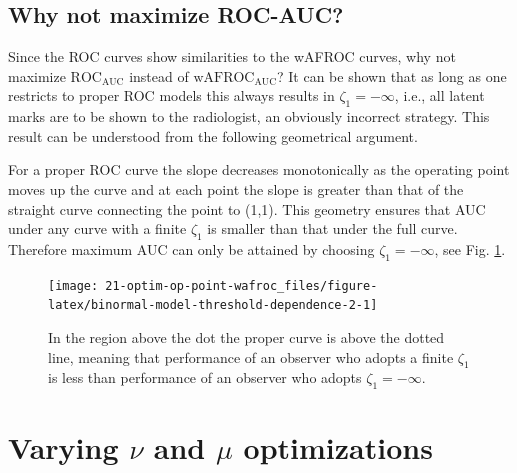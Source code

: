 \documentclass[
]{book}
\begin{document}
\hypertarget{why-not-maximize-roc-auc}{%
\subsection{Why not maximize ROC-AUC?}\label{why-not-maximize-roc-auc}}

Since the ROC curves show similarities to the wAFROC curves, why not maximize \(\text{ROC}_\text{AUC}\) instead of \(\text{wAFROC}_\text{AUC}\)? It can be shown that as long as one restricts to proper ROC models this always results in \(\zeta_1 = -\infty\), i.e., all latent marks are to be shown to the radiologist, an obviously incorrect strategy. This result can be understood from the following geometrical argument.

For a proper ROC curve the slope decreases monotonically as the operating point moves up the curve and at each point the slope is greater than that of the straight curve connecting the point to (1,1). This geometry ensures that AUC under any curve with a finite \(\zeta_1\) is smaller than that under the full curve. Therefore maximum AUC can only be attained by choosing \(\zeta_1 = -\infty\), see Fig. \ref{fig:binormal-model-threshold-dependence-2}.

\begin{figure}

{\centering \texttt{[image: 21-optim-op-point-wafroc\_files/figure-latex/binormal-model-threshold-dependence-2-1]} 

}

\caption{In the region above the dot the proper curve is above the dotted line, meaning that performance of an observer who adopts a finite $\zeta_1$ is less than performance of an observer who adopts $\zeta_1 = -\infty$.}\label{fig:binormal-model-threshold-dependence-2}
\end{figure}

\hypertarget{optim-op-point-vary-nu-mu}{%
\section{\texorpdfstring{Varying \(\nu\) and \(\mu\) optimizations}{Varying \textbackslash nu and \textbackslash mu optimizations}}\label{optim-op-point-vary-nu-mu}}
\end{document}
